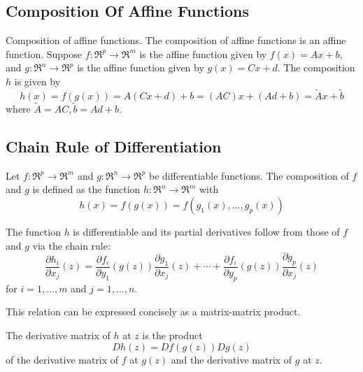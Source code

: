 \subsection{Composition Of Affine Functions}

Composition of affine functions. The composition of affine functions is an affine function. Suppose $ f: \mathfrak{R}^{p} \rightarrow \mathfrak{R}^{m} $ is the affine function given by $ f(x)=A x+b $, and $ g: \mathfrak{R}^{n} \rightarrow \mathfrak{R}^{p} $ is the affine function given by $ g(x)=C x+d $. The composition $ h $ is given by
\begin{equation}
h(x)=f(g(x))=A(C x+d)+b=(A C) x+(A d+b)=\tilde{A} x+\tilde{b}
\end{equation}
where $ \tilde{A}=A C, \tilde{b}=A d+b $.

\subsection{Chain Rule of Differentiation}

\begin{definition}
    Let $ f: \mathfrak{R}^{p} \rightarrow \mathfrak{R}^{m} $ and $ g: \mathfrak{R}^{n} \rightarrow \mathfrak{R}^{p} $ be differentiable functions. The composition of $ f $ and $ g $ is defined as the function $ h: \mathfrak{R}^{n} \rightarrow \mathfrak{R}^{m} $ with
\begin{equation}
h(x)=f(g(x))=f\left(g_{1}(x), \ldots, g_{p}(x)\right)
\end{equation}
\end{definition}

\begin{theorem}
    The function $ h $ is differentiable and its partial derivatives follow from those of $ f $ and $ g $ via the chain rule:
\begin{equation}
\frac{\partial h_{i}}{\partial x_{j}}(z)=\frac{\partial f_{i}}{\partial y_{1}}(g(z)) \frac{\partial g_{1}}{\partial x_{j}}(z)+\cdots+\frac{\partial f_{i}}{\partial y_{p}}(g(z)) \frac{\partial g_{p}}{\partial x_{j}}(z)
\end{equation}
for $ i=1, \ldots, m $ and $ j=1, \ldots, n $.
\end{theorem}

This relation can be expressed concisely as a matrix-matrix product.

\begin{corollary}
    The derivative matrix of $ h $ at $ z $ is the product
\begin{equation}
D h(z)=D f(g(z)) D g(z)
\end{equation}
of the derivative matrix of $ f $ at $ g(z) $ and the derivative matrix of $ g $ at $ z $.
\end{corollary}


